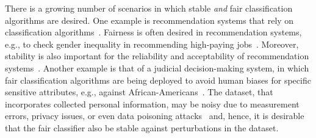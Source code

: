 \documentclass[11pt]{article}
\begin{document}
	There is a growing number of scenarios in which stable {\em and} fair classification algorithms are desired.
	One example is recommendation systems that rely on classification algorithms~\cite{park2012literature,portugal2018the}.
	Fairness is often desired  in recommendation systems, e.g., to check  gender inequality in recommending high-paying jobs~\cite{farahat2012effective,datta2015automated,sweeney2013discrimination}.
	Moreover, stability is also important for the reliability and acceptability of recommendation systems~\cite{adomavicius2012stability,adomavicius2011maximizing,adomavicius2016classification}.
	Another example is that of a judicial decision-making system, in which fair classification algorithms are being deployed to avoid human biases for specific sensitive attributes, e.g., against African-Americans~\cite{flores2016false,angwin2016machine,berk2009role}.
	The dataset, that incorporates collected personal information, may be noisy due to  measurement errors, privacy issues, or even data poisoning attacks~\cite{lam2004shilling,mobasher2007toward,o2004evaluation,barreno2010security} and, hence, it is desirable that the fair classifier also be stable against perturbations in the dataset. 
	
	
	
\end{document}
